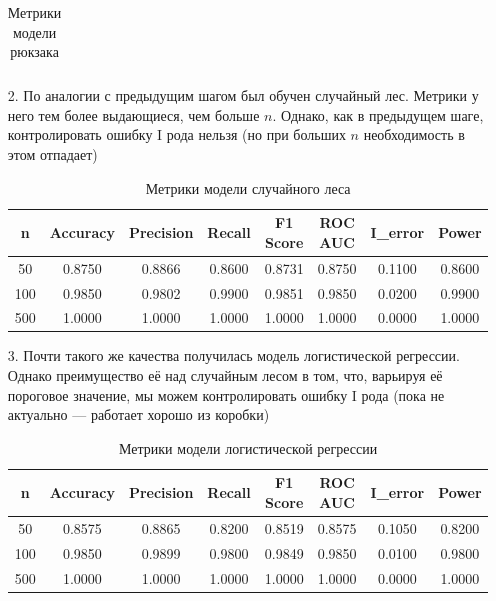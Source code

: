 \documentclass[a4paper,12pt]{article}
\begin{document}
\begin{itemize}
\begin{table}
\begin{tabular}{|c|c|c|c|c|c|c|c|}
        \hline
    \end{tabular}
    \caption*{Метрики модели рюкзака}
    \label{tab:my_label}
\end{table}
\newpage
    \item[2.] По аналогии с предыдущим шагом был обучен случайный лес. Метрики у него тем более выдающиеся, чем больше $n$. Однако, как в предыдущем шаге, контролировать ошибку I рода нельзя (но при больших $n$ необходимость в этом отпадает) \\
    \begin{table}[H]
        \centering
        \begin{tabular}{|c|c|c|c|c|c|c|c|}
            \hline
            n & Accuracy & Precision & Recall & F1 Score & ROC AUC & I\_error & Power \\
            \hline
            50 & 0.8750 & 0.8866 & 0.8600 & 0.8731 & 0.8750 & 0.1100 & 0.8600 \\
            100 & 0.9850 & 0.9802 & 0.9900 & 0.9851 & 0.9850 & 0.0200 & 0.9900 \\
            500 & 1.0000 & 1.0000 & 1.0000 & 1.0000 & 1.0000 & 0.0000 & 1.0000 \\
            \hline
        \end{tabular}
        \caption*{Метрики модели случайного леса}
        \label{tab:random_forest_metrics}
    \end{table}
    \item[3.] Почти такого же качества получилась модель логистической регрессии. Однако преимущество её над случайным лесом в том, что, варьируя её пороговое значение, мы можем контролировать ошибку I рода (пока не актуально --- работает хорошо из коробки)
    \begin{table}[H]
    \centering
    \begin{tabular}{|c|c|c|c|c|c|c|c|}
        \hline
        n & Accuracy & Precision & Recall & F1 Score & ROC AUC & I\_error & Power \\
        \hline
        50 & 0.8575 & 0.8865 & 0.8200 & 0.8519 & 0.8575 & 0.1050 & 0.8200 \\
        100 & 0.9850 & 0.9899 & 0.9800 & 0.9849 & 0.9850 & 0.0100 & 0.9800 \\
        500 & 1.0000 & 1.0000 & 1.0000 & 1.0000 & 1.0000 & 0.0000 & 1.0000 \\
        \hline
    \end{tabular}
    \caption*{Метрики модели логистической регрессии}
    \label{tab:logistic_regression_metrics}
\end{table}
\end{itemize}
\end{document}
